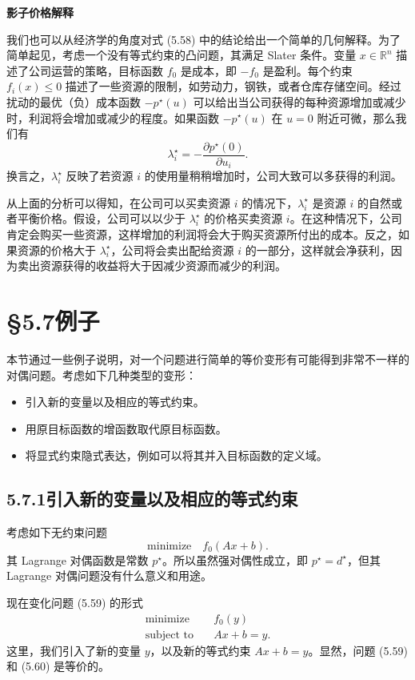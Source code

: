 \documentclass[UTF8, 12pt, fontset=fandol, oneside]{ctexart}
\begin{document}
\noindent\textbf{影子价格解释}

我们也可以从经济学的角度对式 (5.58) 中的结论给出一个简单的几何解释。为了简单起见，考虑一个没有等式约束的凸问题，其满足 Slater 条件。变量 $x\in\mathbb{R}^n$ 描述了公司运营的策略，目标函数 $f_0$ 是成本，即 $-f_0$ 是盈利。每个约束 $f_i(x)\leq 0$ 描述了一些资源的限制，如劳动力，钢铁，或者仓库存储空间。经过扰动的最优（负）成本函数 $-p^\star(u)$ 可以给出当公司获得的每种资源增加或减少时，利润将会增加或减少的程度。如果函数 $-p^\star(u)$ 在 $u=0$ 附近可微，那么我们有
\[
\lambda_i^\star=-\frac{\partial p^\star(0)}{\partial u_i}.
\]
换言之，$\lambda_i^\star$ 反映了若资源 $i$ 的使用量稍稍增加时，公司大致可以多获得的利润。

从上面的分析可以得知，在公司可以买卖资源 $i$ 的情况下，$\lambda_i^\star$ 是资源 $i$ 的自然或者平衡价格。假设，公司可以以少于 $\lambda_i^\star$ 的价格买卖资源 $i$。在这种情况下，公司肯定会购买一些资源，这样增加的利润将会大于购买资源所付出的成本。反之，如果资源的价格大于 $\lambda_i^\star$，公司将会卖出配给资源 $i$ 的一部分，这样就会净获利，因为卖出资源获得的收益将大于因减少资源而减少的利润。

\section*{§5.7\quad 例子}

本节通过一些例子说明，对一个问题进行简单的等价变形有可能得到非常不一样的对偶问题。考虑如下几种类型的变形：
\begin{itemize}
\item 引入新的变量以及相应的等式约束。
\item 用原目标函数的增函数取代原目标函数。
\item 将显式约束隐式表达，例如可以将其并入目标函数的定义域。
\end{itemize}

\subsection*{5.7.1\quad 引入新的变量以及相应的等式约束}

考虑如下无约束问题
\begin{equation}
\text{minimize}\quad f_0(Ax+b).
\tag{5.59}
\end{equation}
其 Lagrange 对偶函数是常数 $p^\star$。所以虽然强对偶性成立，即 $p^\star=d^\star$，但其 Lagrange 对偶问题没有什么意义和用途。

现在变化问题 (5.59) 的形式
\begin{equation}
\begin{aligned}
\text{minimize}\quad & f_0(y)\\
\text{subject to}\quad & Ax+b=y.
\end{aligned}
\tag{5.60}
\end{equation}
这里，我们引入了新的变量 $y$，以及新的等式约束 $Ax+b=y$。显然，问题 (5.59) 和 (5.60) 是等价的。
\end{document}
